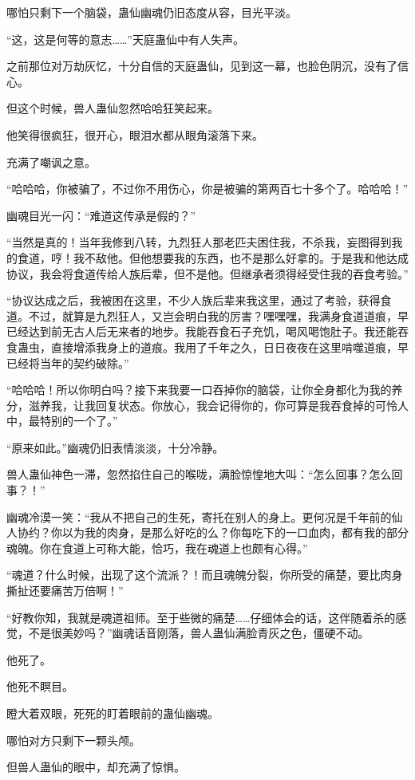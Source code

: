 \begin{this_body}
哪怕只剩下一个脑袋，蛊仙幽魂仍旧态度从容，目光平淡。

“这，这是何等的意志……”天庭蛊仙中有人失声。

之前那位对万劫灰忆，十分自信的天庭蛊仙，见到这一幕，也脸色阴沉，没有了信心。

但这个时候，兽人蛊仙忽然哈哈狂笑起来。

他笑得很疯狂，很开心，眼泪水都从眼角滚落下来。

充满了嘲讽之意。

“哈哈哈，你被骗了，不过你不用伤心，你是被骗的第两百七十多个了。哈哈哈！”

幽魂目光一闪：“难道这传承是假的？”

“当然是真的！当年我修到八转，九烈狂人那老匹夫困住我，不杀我，妄图得到我的食道，哼！我不敌他。但他想要我的东西，也不是那么好拿的。于是我和他达成协议，我会将食道传给人族后辈，但不是他。但继承者须得经受住我的吞食考验。”

“协议达成之后，我被困在这里，不少人族后辈来我这里，通过了考验，获得食道。不过，就算是九烈狂人，又岂会明白我的厉害？嘿嘿嘿，我满身食道道痕，早已经达到前无古人后无来者的地步。我能吞食石子充饥，喝风喝饱肚子。我还能吞食蛊虫，直接增添我身上的道痕。我用了千年之久，日日夜夜在这里啃噬道痕，早已经将当年的契约破除。”

“哈哈哈！所以你明白吗？接下来我要一口吞掉你的脑袋，让你全身都化为我的养分，滋养我，让我回复状态。你放心，我会记得你的，你可算是我吞食掉的可怜人中，最特别的一个了。”

“原来如此。”幽魂仍旧表情淡淡，十分冷静。

兽人蛊仙神色一滞，忽然掐住自己的喉咙，满脸惊惶地大叫：“怎么回事？怎么回事？！”

幽魂冷漠一笑：“我从不把自己的生死，寄托在别人的身上。更何况是千年前的仙人协约？你以为我的肉身，是那么好吃的么？你每吃下的一口血肉，都有我的部分魂魄。你在食道上可称大能，恰巧，我在魂道上也颇有心得。”

“魂道？什么时候，出现了这个流派？！而且魂魄分裂，你所受的痛楚，要比肉身撕扯还要痛苦万倍啊！”

“好教你知，我就是魂道祖师。至于些微的痛楚……仔细体会的话，这伴随着杀的感觉，不是很美妙吗？”幽魂话音刚落，兽人蛊仙满脸青灰之色，僵硬不动。

他死了。

他死不瞑目。

瞪大着双眼，死死的盯着眼前的蛊仙幽魂。

哪怕对方只剩下一颗头颅。

但兽人蛊仙的眼中，却充满了惊惧。

\end{this_body}

